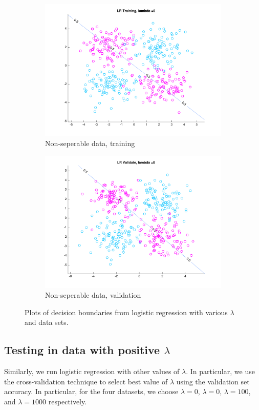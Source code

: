 \begin{figure}[h!]
    \begin{subfigure}[b]{0.4\textwidth}
	\includegraphics[scale=0.4]{hw2_1_nonsep_a_0.pdf}
	\caption{Non-seperable data, training}\label{fig:data_nonsep_a}
    \end{subfigure}  
    \quad
    \begin{subfigure}[b]{0.4\textwidth}
	\includegraphics[scale=0.4]{hw2_1_nonsep_b_0.pdf}
	\caption{Non-seperable data, validation}\label{fig:data_nonsep_b}
    \end{subfigure}  
    \caption{Plots of decision boundaries from logistic regression with various $\lambda$ and data sets.}  \label{fig:LR_plots}  
\end{figure}


\subsection{Testing in data with positive $\lambda$}
Similarly, we run logistic regression with other values of $\lambda$. In particular, we use the cross-validation technique to select best value of $\lambda$ using the validation set accuracy. In particular, for the four datasets, we choose $\lambda = 0$, $\lambda = 0$, $\lambda = 100$, and $\lambda = 1000$ respectively.